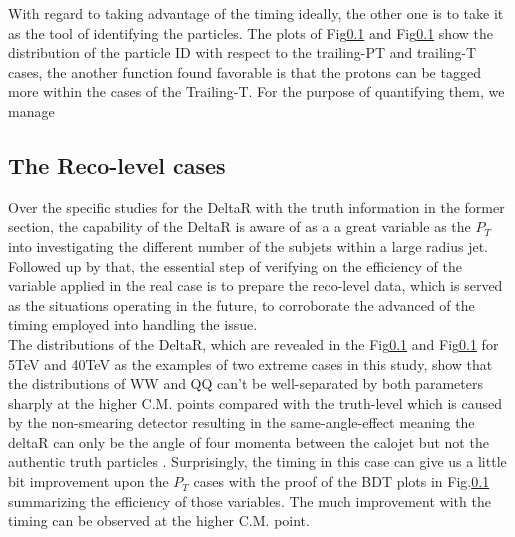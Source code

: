 With regard to taking advantage of the timing ideally, the other one is to take it as the tool of identifying the particles. The plots of Fig\ref{} and Fig\ref{} show the distribution of the particle ID with respect to the trailing-PT and trailing-T cases, the another function found favorable is that the protons can be tagged more within the cases of the Trailing-T. For the purpose of quantifying them, we manage 


\subsection{The Reco-level cases}
Over the specific studies for the DeltaR with the truth information in the former section, the capability of the DeltaR is aware of as a a great variable as the $P_{T}$ into investigating the different number of the subjets within a large radius jet. Followed up by that, the essential step of verifying on the efficiency of the variable applied in the real case is to prepare the reco-level data, which is served as the situations operating in the future, to corroborate the advanced of the timing employed into handling the issue.\\ 

The distributions of the DeltaR, which are revealed in the Fig\ref{} and Fig\ref{} for 5TeV and 40TeV as the examples of two extreme cases in this study, show that the distributions of WW and QQ can't be well-separated by both parameters sharply at the higher C.M. points compared with the truth-level which is caused by the non-smearing detector resulting in the same-angle-effect meaning the deltaR can only be the angle of four momenta between the calojet but not the authentic truth particles . Surprisingly, the timing in this case can give us a little bit improvement upon the $P_{T}$ cases with the proof of the BDT plots in Fig.\ref{} summarizing the efficiency of those variables. The much improvement with the timing can be observed at the higher C.M. point.\\

